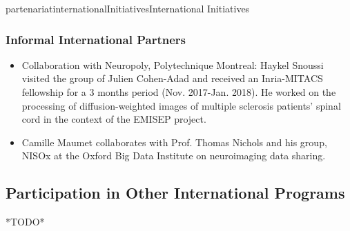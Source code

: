 \documentclass{ra2018}
\begin{document}
\begin{module}{partenariat}{internationalInitiatives}{International Initiatives}
        \subsubsection{Informal International Partners}
        

\begin{itemize}
    \item Collaboration with Neuropoly, Polytechnique Montreal: Haykel Snoussi visited the group of Julien Cohen-Adad and received an Inria-MITACS fellowship for a 3 months period (Nov. 2017-Jan. 2018). He worked on the processing of diffusion-weighted images of multiple sclerosis patients' spinal cord in the context of the EMISEP project.
    \item Camille Maumet collaborates with Prof. Thomas Nichols and his group, NISOx at the Oxford Big Data Institute on neuroimaging data sharing.
\end{itemize}

\subsection{Participation in Other International Programs}
*TODO*





\end{module}
\end{document}
